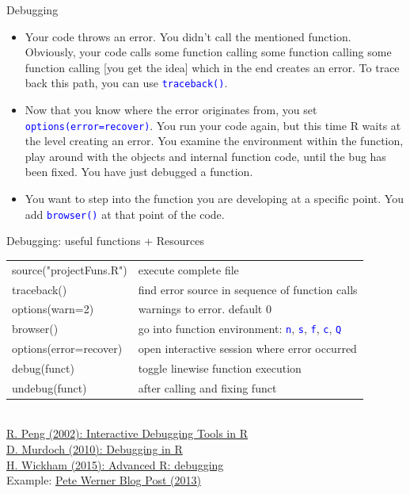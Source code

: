 \documentclass[xcolor=table,      handout ,    xcolor=dvipsnames]{beamer}\usepackage[]{graphicx}\usepackage[]{color}
\newcommand{\rcode}[1]{\texttt{\textcolor{Blue}{#1}}}
\begin{document}

\begin{frame}[fragile]{Debugging}
\begin{itemize}[<+->]
\item Your code throws an error.
You didn't call the mentioned function.
Obviously, your code calls some function calling some function calling some function calling [you get the idea] which in the end creates an error.
To trace back this path, you can use \rcode{traceback()}.

\item Now that you know where the error originates from, you set \rcode{options(error=recover)}.
You run your code again, but this time R waits at the level creating an error.
You examine the environment within the function, play around with the objects and internal function code, until the bug has been fixed.
You have just debugged a function.

\item You want to step into the function you are developing at a specific point.
You add \rcode{browser()} at that point of the code.
\end{itemize}
\end{frame}


\begin{frame}[fragile]{Debugging: useful functions + Resources}
\begin{tabular}{ll}
\pause source("projectFuns.R") & execute complete file\\
\pause traceback() & find error source in sequence of function calls\\
\pause options(warn=2) & warnings to error. default 0\\
\pause browser() & go into function environment: \rcode{n}, \rcode{s}, \rcode{f}, \rcode{c}, \rcode{Q}\\
\pause \alert{options(error=recover)} & \alert{open interactive session where error occurred}\\
\pause debug(funct) & toggle linewise function execution\\
\pause undebug(funct) & after calling and fixing funct\\
\end{tabular}\\

\pause \vspace{1em}
\href{http://www.biostat.jhsph.edu/~rpeng/docs/R-debug-tools.pdf}{R. Peng (2002): Interactive Debugging Tools in R}\\
\href{https://www.stats.umanitoba.ca/files/statsweb/2011/03/debugging.pdf}{D. Murdoch (2010): Debugging in R}\\
\href{http://adv-r.had.co.nz/Exceptions-Debugging.html}{H. Wickham (2015): Advanced R: debugging}\\
Example: \href{https://www.r-bloggers.com/tracking-down-errors-in-r/}{Pete Werner Blog Post (2013)}
\end{frame}
\end{document}
